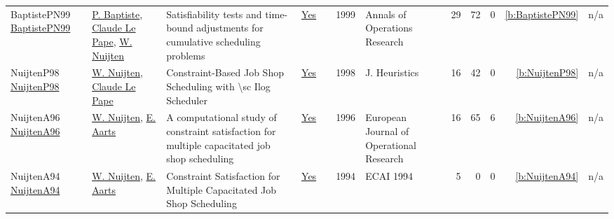 {\begin{longtable}{>{\raggedright\arraybackslash}p{3cm}>{\raggedright\arraybackslash}p{6cm}>{\raggedright\arraybackslash}p{6.5cm}rrrp{2.5cm}rrrrr}
BaptistePN99 \href{http://dx.doi.org/10.1023/a:1018995000688}{BaptistePN99} & \hyperref[auth:a163]{P. Baptiste}, \hyperref[auth:a164]{Claude Le Pape}, \hyperref[auth:a662]{W. Nuijten} & Satisfiability tests and time-bound adjustments for cumulative scheduling problems & \href{../works/BaptistePN99.pdf}{Yes} & \cite{BaptistePN99} & 1999 & Annals of Operations Research & 29 & 72 & 0 & \ref{b:BaptistePN99} & n/a\\
NuijtenP98 \href{https://doi.org/10.1023/A:1009687210594}{NuijtenP98} & \hyperref[auth:a662]{W. Nuijten}, \hyperref[auth:a164]{Claude Le Pape} & Constraint-Based Job Shop Scheduling with {\textbackslash}sc Ilog Scheduler & \href{../works/NuijtenP98.pdf}{Yes} & \cite{NuijtenP98} & 1998 & J. Heuristics & 16 & 42 & 0 & \ref{b:NuijtenP98} & n/a\\
NuijtenA96 \href{http://dx.doi.org/10.1016/0377-2217(95)00354-1}{NuijtenA96} & \hyperref[auth:a662]{W. Nuijten}, \hyperref[auth:a783]{E. Aarts} & A computational study of constraint satisfaction for multiple capacitated job shop scheduling & \href{../works/NuijtenA96.pdf}{Yes} & \cite{NuijtenA96} & 1996 & European Journal of Operational Research & 16 & 65 & 6 & \ref{b:NuijtenA96} & n/a\\
NuijtenA94 \href{}{NuijtenA94} & \hyperref[auth:a662]{W. Nuijten}, \hyperref[auth:a783]{E. Aarts} & Constraint Satisfaction for Multiple Capacitated Job Shop Scheduling & \href{../works/NuijtenA94.pdf}{Yes} & \cite{NuijtenA94} & 1994 & ECAI 1994 & 5 & 0 & 0 & \ref{b:NuijtenA94} & n/a\\
\end{longtable}
}

\clearpage
